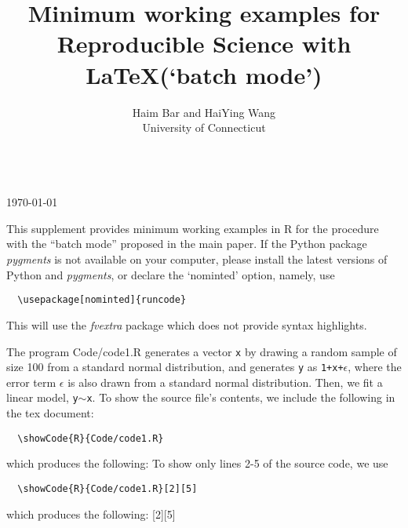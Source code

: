 \documentclass[12pt]{amsart}
\title{Minimum working examples for\\ Reproducible Science with \LaTeX\space (`batch mode')}
\begin{document}
\maketitle


\begin{center}
\author{Haim Bar and HaiYing Wang\\ University of Connecticut}\\
\today
\end{center}

This supplement provides minimum working examples in R for the procedure with the ``batch mode'' proposed in the main paper. If the Python package \textit{pygments} is not available on your computer, please install the latest versions of Python and \textit{pygments},  %
or declare the `nominted' option, namely, use
\begin{verbatim}
  \usepackage[nominted]{runcode}
\end{verbatim}
This will use the \textit{fvextra} package which does not provide syntax highlights.
\vspace{2mm}


The program Code/code1.R generates a vector \texttt{x} by drawing a random sample of size 100 from a standard normal distribution, and generates \texttt{y} as \texttt{1+x+$\epsilon$}, where the error term \texttt{$\epsilon$}
is also drawn from a standard normal distribution.
Then, we fit a linear model, \texttt{y$\sim$x}. To show the source file's contents, we include the following in the tex document:
\begin{verbatim}
  \showCode{R}{Code/code1.R}
\end{verbatim}
which produces the following:
To show only lines 2-5 of the source code, we use
\begin{verbatim}
  \showCode{R}{Code/code1.R}[2][5]
\end{verbatim}
which produces the following:
[2][5]
\vspace{2mm}
\end{document}
